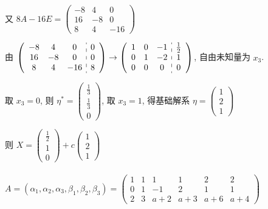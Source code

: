 		 又 \( 8A - 16E = \begin{pmatrix}
			 -8 & 4  & 0   \\
			 16 & -8 & 0   \\
			 8  & 4  & -16
		 \end{pmatrix} \)

		 由 \( \left(\begin{array}{ccc:c}
				 -8 & 4  & 0   & 0 \\
				 16 & -8 & 0   & 0 \\
				 8  & 4  & -16 & 8
			 \end{array}\right) \rightarrow
		 \left(\begin{array}{ccc:c}
				 1 & 0 & -1 & \frac{1}{2} \\
				 0 & 1 & -2 & 1           \\
				 0 & 0 & 0  & 0
			 \end{array}\right) \), 自由未知量为 \( x_{3} \).

		 取 \( x_{3} = 0 \), 则 \( \eta^{*} = \begin{pmatrix}
			 \frac{1}{3} \\
			 \frac{1}{3} \\
			 0
		 \end{pmatrix} \), 取 \( x_{3} = 1 \), 得基础解系 \( \eta=\begin{pmatrix}
			 1 \\
			 2 \\
			 1
		 \end{pmatrix} \)

		 则 \( X = \begin{pmatrix}
			 \frac{1}{2} \\
			 1           \\
			 0
		 \end{pmatrix} + c\begin{pmatrix}
			 1 \\
			 2 \\
			 1
		 \end{pmatrix} \)


	 \paragraph{} %
		 \( A = (\alpha_{1}, \alpha_{2}, \alpha_{3}, \beta_{1}, \beta_{2}, \beta_{3}) = \begin{pmatrix}
			 1 & 1 & 1   & 1   & 2   & 2   \\
			 0 & 1 & -1  & 2   & 1   & 1   \\
			 2 & 3 & a+2 & a+3 & a+6 & a+4
		 \end{pmatrix} \)

